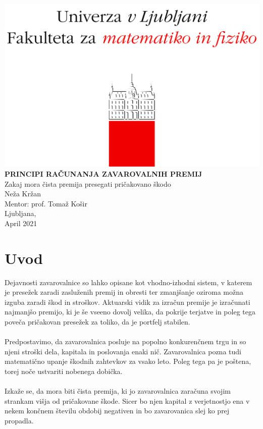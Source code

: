 \documentclass[a4paper,12pt]{homework}
\begin{document}
	\begin{titlepage}
		\begin{center}
			\includegraphics[scale=0.50]{logo.png}
			\vspace{4cm}
			\\
			\Huge
			\textbf{PRINCIPI RAČUNANJA ZAVAROVALNIH PREMIJ}
			\\
			\vspace{1cm}
			\Large
			Zakaj mora čista premija presegati pričakovano škodo
			\\
			\vspace{2cm}
			\large
			Neža Kržan \\
			Mentor: prof. Tomaž Košir \\
			\vspace{7cm}
			Ljubljana, \\ April 2021
		\end{center}
	\end{titlepage}
	
	\newpage
	\tableofcontents
	
	\newpage
	\section{Uvod}
	Dejavnosti zavarovalnice so lahko opisane kot vhodno-izhodni sistem, v katerem je presežek zaradi zasluženih premij in obresti ter zmanjšanje oziroma možna izguba zaradi škod in stroškov. Aktuarski vidik za izračun premije je izračunati najmanjšo premijo, ki je še vseeno dovolj velika, da pokrije terjatve in poleg tega poveča pričakovan presežek za toliko, da je portfelj stabilen.
	\\
	\\
	Predpostavimo, da zavarovalnica posluje na popolno konkurenčnem trgu in so njeni stroški dela, kapitala in poslovanja enaki nič. Zavarovalnica pozna tudi matematično upanje škodnih zahtevkov za vsako leto. Poleg tega pa je poštena, torej noče ustvariti nobenega dobička. 
	\\
	\\
	Izkaže se, da mora biti čista premija, ki jo zavarovalnica zaračuna svojim strankam višja od pričakovane škode. Sicer bo njen kapital z verjetnostjo ena v nekem končnem številu obdobij negativen in bo zavarovanica slej ko prej propadla.
	
\end{document}

